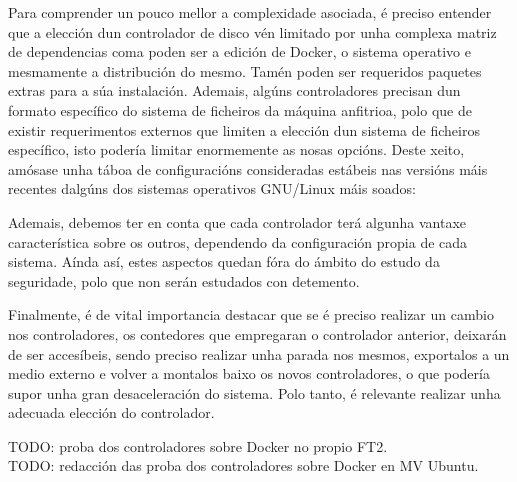 \begin{enumerate}
    Para comprender un pouco mellor a complexidade asociada, é preciso entender que a elección dun controlador de disco vén limitado por unha complexa matriz de dependencias coma poden ser a edición de Docker, o sistema operativo e mesmamente a distribución do mesmo. Tamén poden ser requeridos paquetes extras para a súa instalación. Ademais, algúns controladores precisan dun formato específico do sistema de ficheiros da máquina anfitrioa, polo que de existir requerimentos externos que limiten a elección dun sistema de ficheiros específico, isto podería limitar enormemente as nosas opcións. Deste xeito, amósase unha táboa de configuracións consideradas estábeis nas versións máis recentes dalgúns dos sistemas operativos GNU/Linux máis soados:

\begin{table}[H]
\centering
\caption{Táboa de configuracións de controladores de almacenamento}
\label{conf-controladores-almacenamento}
\end{table}
    
    Ademais, debemos ter en conta que cada controlador terá algunha vantaxe característica sobre os outros, dependendo da configuración propia de cada sistema. Aínda así, estes aspectos quedan fóra do ámbito do estudo da seguridade, polo que non serán estudados con detemento.
    
    Finalmente, é de vital importancia destacar que se é preciso realizar un cambio nos controladores, os contedores que empregaran o controlador anterior, deixarán de ser accesíbeis, sendo preciso realizar unha parada nos mesmos, exportalos a un medio externo e volver a montalos baixo os novos controladores, o que podería supor unha gran desaceleración do sistema. Polo tanto, é relevante realizar unha adecuada elección do controlador.
    
\end{enumerate}

{\LARGE TODO: proba dos controladores sobre Docker no propio FT2.}\\

{\LARGE TODO: redacción das proba dos controladores sobre Docker en MV Ubuntu.}

